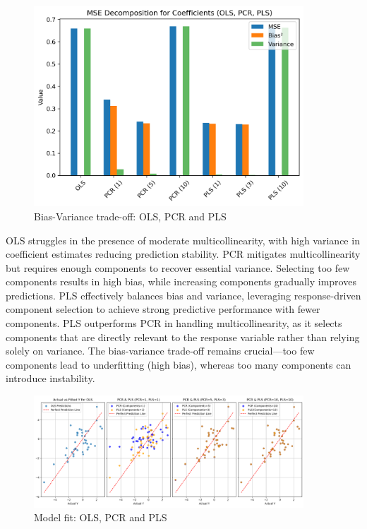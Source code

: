 \documentclass[11pt,twoside,a4paper]{article}
\begin{document}
\begin{figure}[H]
    \centering
    \includegraphics[width=0.9\textwidth]{Fifth_plot_second_simulation.png}
    \caption{Bias-Variance trade-off: OLS, PCR and PLS}
    \label{fig:PLS_analysis}
\end{figure}

OLS struggles in the presence of moderate multicollinearity, with high variance in coefficient estimates reducing prediction stability. PCR mitigates multicollinearity but requires enough components to recover essential variance. Selecting too few components results in high bias, while increasing components gradually improves predictions. PLS effectively balances bias and variance, leveraging response-driven component selection to achieve strong predictive performance with fewer components. PLS outperforms PCR in handling multicollinearity, as it selects components that are directly relevant to the response variable rather than relying solely on variance. The bias-variance trade-off remains crucial—too few components lead to underfitting (high bias), whereas too many components can introduce instability.

\begin{figure}[H]
    \centering
    \includegraphics[width=0.9\textwidth]{Third_plot_second_simulation.png}
    \caption{Model fit: OLS, PCR and PLS}
    \label{fig:PLS_analysis}
\end{figure}
\end{document}
